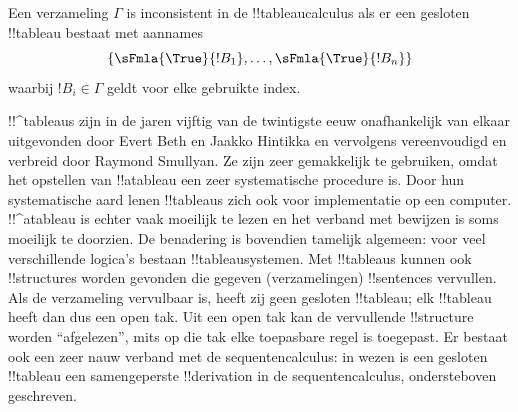\documentclass[../../../include/open-logic-section]{subfiles}
\begin{document}
Een verzameling $\Gamma$ is inconsistent in de !!{tableau}calculus als
er een gesloten !!{tableau} bestaat met aannames
\[
\{\sFmla{\True}{!B_1}, \dots, \sFmla{\True}{!B_n}\} 
\]
waarbij $!B_i \in \Gamma$ geldt voor elke gebruikte index.

!!^{tableau}s zijn in de jaren vijftig van de twintigste eeuw
onafhankelijk van elkaar uitgevonden door Evert Beth en Jaakko
Hintikka en vervolgens vereenvoudigd en verbreid door Raymond
Smullyan. Ze zijn zeer gemakkelijk te gebruiken, omdat het opstellen
van !!a{tableau} een zeer systematische procedure is. Door hun
systematische aard lenen !!{tableau}s zich ook voor implementatie op
een computer. !!^a{tableau} is echter vaak moeilijk te lezen en het
verband met bewijzen is soms moeilijk te doorzien. De benadering is
bovendien tamelijk algemeen: voor veel verschillende logica's bestaan
!!{tableau}systemen. Met !!{tableau}s kunnen ook !!{structure}s worden
gevonden die gegeven (verzamelingen) !!{sentence}s vervullen. Als de
verzameling vervulbaar is, heeft zij geen gesloten !!{tableau}; elk
!!{tableau} heeft dan dus een open tak. Uit een open tak kan de
vervullende !!{structure} worden ``afgelezen'', mits op die tak elke
toepasbare regel is toegepast. Er bestaat ook een zeer nauw verband
met de sequentencalculus: in wezen is een gesloten !!{tableau} een
samengeperste !!{derivation} in de sequentencalculus, ondersteboven
geschreven.
\end{document}
